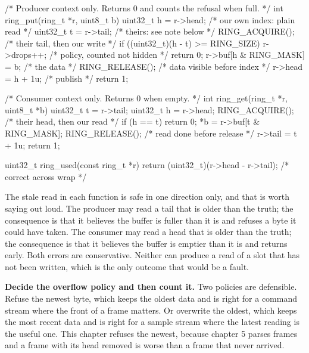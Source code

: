 \begin{steps}
\begin{ccode}
/* Producer context only. Returns 0 and counts the refusal when full. */
int ring_put(ring_t *r, uint8_t b)
{
    uint32_t h = r->head;                    /* our own index: plain read  */
    uint32_t t = r->tail;                    /* theirs: see note below     */
    RING_ACQUIRE();                          /* their tail, then our write */
    if ((uint32_t)(h - t) >= RING_SIZE) {
        r->drops++;                          /* policy, counted not hidden */
        return 0;
    }
    r->buf[h & RING_MASK] = b;               /* the data                   */
    RING_RELEASE();                          /* data visible before index  */
    r->head = h + 1u;                        /* publish                    */
    return 1;
}

/* Consumer context only. Returns 0 when empty. */
int ring_get(ring_t *r, uint8_t *b)
{
    uint32_t t = r->tail;
    uint32_t h = r->head;
    RING_ACQUIRE();                          /* their head, then our read  */
    if (h == t)
        return 0;
    *b = r->buf[t & RING_MASK];
    RING_RELEASE();                          /* read done before release   */
    r->tail = t + 1u;
    return 1;
}

uint32_t ring_used(const ring_t *r)
{
    return (uint32_t)(r->head - r->tail);    /* correct across wrap        */
}
\end{ccode}
The stale read in each function is safe in one direction only, and that is worth
saying out loud. The producer may read a tail that is older than the truth; the
consequence is that it believes the buffer is fuller than it is and refuses a
byte it could have taken. The consumer may read a head that is older than the
truth; the consequence is that it believes the buffer is emptier than it is and
returns early. Both errors are conservative. Neither can produce a read of a
slot that has not been written, which is the only outcome that would be a fault.

\item \textbf{Decide the overflow policy and then count it.} Two policies are
defensible. Refuse the newest byte, which keeps the oldest data and is right for
a command stream where the front of a frame matters. Or overwrite the oldest,
which keeps the most recent data and is right for a sample stream where the
latest reading is the useful one. This chapter refuses the newest, because
chapter 5 parses frames and a frame with its head removed is worse than a frame
that never arrived.


\end{steps}
